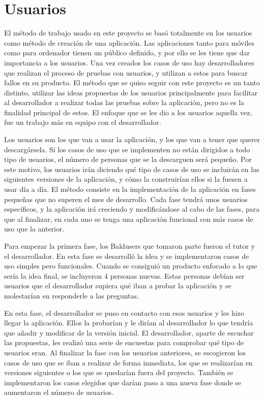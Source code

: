 \chapter{Usuarios}
\label{ch:Usuarios}



El método de trabajo usado en este proyecto se basó totalmente en los usuarios como método de creación de una aplicación. Las aplicaciones tanto para móviles como para ordenador tienen un público definido, y por ello se les tiene que dar importancia a los usuarios.
Una vez creados los casos de uso hay desarrolladores que realizan el proceso de pruebas con usuarios, y utilizan a estos para buscar fallos en su producto. El método que se quiso seguir con este proyecto es un tanto distinto, utilizar las ideas propuestas de los usuarios principalmente para facilitar al desarrollador a realizar todas las pruebas sobre la aplicación, pero no es la finalidad principal de estos. El enfoque que se les dio a los usuarios aquella vez, fue un trabajo más en equipo con el desarrollador.

Los usuarios son los que van a usar la aplicación, y los que van a tener que querer descargársela. Si los casos de uso que se implementen no están dirigidos a todo tipo de usuarios, el número de personas que se la descarguen será pequeño.
Por este motivo, los usuarios irán diciendo qué tipo de casos de uso se incluirán en las siguientes versiones de la aplicación, y cómo la construirían ellos si la fuesen a usar día a día.
El método consiste en la implementación de la aplicación en fases pequeñas que no superen el mes de desarrollo.
Cada fase tendrá unos usuarios específicos, y la aplicación irá creciendo y modificándose al cabo de las fases, para que al finalizar, en cada uno se tenga una aplicación funcional con más casos de uso que la anterior.

Para empezar la primera fase, los Baldusers que tomaron parte fueron el tutor y el desarrollador.
En esta fase se desarrolló la idea y se implementaron casos de uso simples pero funcionales.
Cuando se consiguió un producto enfocado a lo que sería la idea final, se incluyeron 4 personas nuevas. Estas personas debían ser usuarios que el desarrollador supiera qué iban a probar la aplicación y se molestarían en responderle a las preguntas. 

En esta fase, el desarrollador se puso en contacto con esos usuarios y les hizo llegar la aplicación. Ellos la probarían y le dirían al desarrollador lo que tendría que añadir y modificar de la versión inicial. El desarrollador, aparte de escuchar las propuestas, les realizó una serie de encuestas para comprobar qué tipo de usuarios eran.
Al finalizar la fase con los usuarios anteriores, se escogieron los casos de uso que se iban a realizar de forma inmediata, los que se realizarían en versiones siguientes o los que se quedarían fuera del proyecto.
También se implementaron los casos elegidos que darían paso a una nueva fase donde se aumentaron el número de usuarios.

